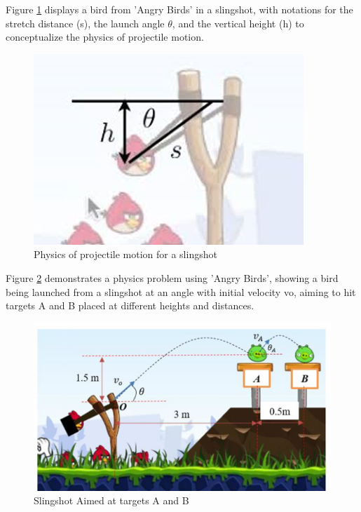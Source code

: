 \documentclass[12pt, titlepage]{article}
\begin{document}
Figure \ref{fig:FIG2}  displays a bird from 'Angry Birds' in a slingshot, with notations for the stretch distance (s), the launch angle $\theta$, and the vertical height (h) to conceptualize the physics of projectile motion.



\begin{figure}[!h]
    \centering
    \includegraphics[scale=1]{Picture2.jpg} 
    \caption{Physics of projectile motion for a slingshot}
    \label{fig:FIG2}
\end{figure}

\vspace{2cm}
Figure \ref{fig:FIG3} demonstrates a physics problem using 'Angry Birds', showing a bird being launched from a slingshot at an angle with initial velocity vo, aiming to hit targets A and B placed at different heights and distances.

\begin{figure}[!h]
    \centering
    \includegraphics[scale=1]{Picture3.png} 
    \caption{Slingshot Aimed at targets A and B}
    \label{fig:FIG3}
\end{figure}
\end{document}
